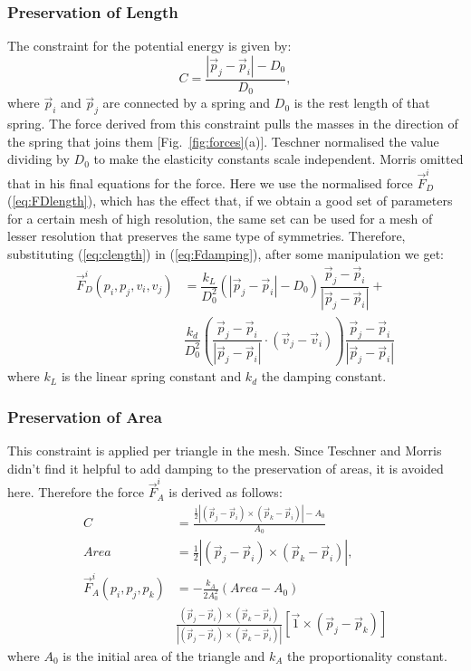\documentclass[journal]{IEEEtran}
\newcommand{\eref}[1]{(\ref{#1})}
\newcommand{\fref}[1]{Fig.~\ref{#1}}
\begin{document}
\subsubsection{Preservation of Length}
The constraint for the potential energy is given by:
\begin{equation}
 C = \dfrac{|\vec{p}_j-\vec{p}_i|-D_0}{D_0}, \label{eq:clength}
\end{equation}
where $\vec{p}_i$ and $\vec{p}_j$ are connected by a spring and $D_0$ is the rest length of that spring.  The force derived from this constraint pulls the masses in the direction of the spring that joins them [\fref{fig:forces}(a)].  Teschner normalised the value dividing by $D_0$ to make the elasticity constants scale independent.  Morris \cite{Morris2008} omitted that in his final equations for the force.  Here we use the normalised force $\vec{F}^i_D$ \eref{eq:FDlength}, which has the effect that, if we obtain a good set of parameters for a certain mesh of high resolution, the same set can be used for a mesh of lesser resolution that preserves the same type of symmetries.  Therefore, substituting \eref{eq:clength} in \eref{eq:Fdamping}, after some manipulation we get:
\begin{align}
 \vec{F}^i_D(p_i,p_j,v_i,v_j) &= \dfrac{k_L}{D_0^2} \left( |\vec{p}_j-\vec{p}_i|-D_0 \right) \dfrac{\vec{p}_j-\vec{p}_i}{|\vec{p}_j-\vec{p}_i|}  + \nonumber \\
 & \dfrac{k_d}{D_0^2}\left( \dfrac{\vec{p}_j-\vec{p}_i}{|\vec{p}_j-\vec{p}_i|} \cdot (\vec{v}_j-\vec{v}_i) \right) \dfrac{\vec{p}_j-\vec{p}_i}{|\vec{p}_j-\vec{p}_i|} \label{eq:FDlength}
\end{align}
where $k_L$ is the linear spring constant and $k_d$ the damping constant.

\subsubsection{Preservation of Area}
This constraint is applied per triangle in the mesh.  Since Teschner and Morris didn't find it helpful to add damping to the preservation of areas, it is avoided here.  Therefore the force $\vec{F}^i_A$ is derived as follows:
\begin{align}
 C &= \frac{\frac{1}{2}|(\vec{p}_j-\vec{p}_i)\times(\vec{p}_k-\vec{p}_i)|-A_0}{A_0} \\
 Area &= \frac{1}{2}|(\vec{p}_j-\vec{p}_i)\times(\vec{p}_k-\vec{p}_i)|, \\
 \vec{F}^i_A(p_i,p_j,p_k) &= -\frac{k_A}{2A_0^2} \left( Area-A_0 \right) \nonumber \\
 & \frac{(\vec{p}_j-\vec{p}_i)\times(\vec{p}_k-\vec{p}_i)}{|(\vec{p}_j-\vec{p}_i)\times(\vec{p}_k-\vec{p}_i)|} [\vec{1} \times (\vec{p}_j-\vec{p}_k)] \label{eq:area_force}
\end{align}
where $A_0$ is the initial area of the triangle and $k_A$ the proportionality constant.
\end{document}
